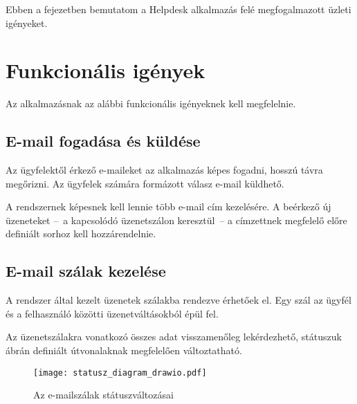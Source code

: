 Ebben a fejezetben bemutatom a \foreignlanguage{british}{Helpdesk} alkalmazás felé megfogalmazott üzleti igényeket.



\section{Funkcionális igények}
Az alkalmazásnak az alábbi funkcionális igényeknek kell megfelelnie.


\subsection{E-mail fogadása és küldése}\label{sec:email_fogadas_kuldes}
Az ügyfelektől érkező e-maileket az alkalmazás képes fogadni, hosszú távra megőrizni. Az ügyfelek számára formázott válasz e-mail küldhető.

A rendszernek képesnek kell lennie több e-mail cím kezelésére. A beérkező új üzeneteket --~a kapcsolódó üzenetszálon keresztül~-- a címzettnek megfelelő előre definiált sorhoz kell hozzárendelnie.



\subsection{E-mail szálak kezelése}
A rendszer által kezelt üzenetek szálakba rendezve érhetőek el. Egy szál az ügyfél és a felhasználó közötti üzenetváltásokból épül fel.

Az üzenetszálakra vonatkozó összes adat visszamenőleg lekérdezhető, státuszuk  ábrán definiált útvonalaknak megfelelően változtatható.


\begin{figure}[hbt] 
	\centering
	\texttt{[image: statusz\_diagram\_drawio.pdf]}
	\caption{Az e-mailszálak státuszváltozásai}
	\label{fig:statusz_diagram}
\end{figure}



